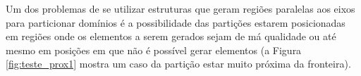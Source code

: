 Um dos problemas de se utilizar estruturas que geram regiões paralelas aos eixos para particionar domínios é a possibilidade das partições estarem posicionadas em regiões onde os elementos a serem gerados sejam de má qualidade ou até mesmo em posições em que não é possível gerar elementos (a Figura \ref{fig:teste_prox1} mostra um caso da partição estar muito próxima da fronteira). 


\begin{figure}[ht]
	\centering
	\qquad
	

\end{figure}
